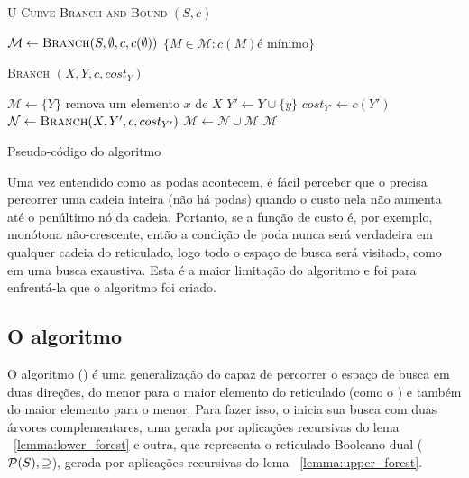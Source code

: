 \begin{algorithm}[!ht]
\textsc{U-Curve-Branch-and-Bound} $(S, c)$
\begin{algorithmic}[1]
    \State $\mathcal{M} \gets {\normalfont\textsc{Branch}} (S, \emptyset, c, c (\emptyset))$
    \Return $\{M \in \mathcal{M} : c(M) \text{é mínimo}\}$
\end{algorithmic}
\vspace{1em}

\textsc{Branch} $(X, Y, c, cost_Y)$
\begin{algorithmic}[1]
    \State $\mathcal{M} \gets \{Y\}$
        \State remova um elemento $x$ de $X$
        \State $Y' \gets Y \cup \{y\}$
        \State $cost_{Y'} \gets c (Y')$
            \State $\mathcal{N} \gets {\normalfont\textsc{Branch}} (X, Y', c, cost_{Y'})$
            \State $\mathcal{M} \gets \mathcal{N} \cup \mathcal{M}$
        \EndIf
    \EndWhile
    \Return $\mathcal{M}$
\end{algorithmic}
\caption{Pseudo-código do algoritmo }
\end{algorithm}

Uma vez entendido como as podas acontecem, é fácil perceber que o 
 precisa percorrer uma cadeia inteira (não há podas) quando
o custo nela não aumenta até o penúltimo nó da cadeia. Portanto, se a 
função de custo é, por exemplo, monótona não-crescente, então a condição
de poda nunca será verdadeira em qualquer cadeia do reticulado, logo 
todo o espaço de busca será visitado, como em uma busca exaustiva. Esta
é a maior limitação do algoritmo  e foi para enfrentá-la 
que o algoritmo  foi criado.

\subsection{O algoritmo }
O algoritmo  () é uma 
generalização do  capaz de percorrer o espaço de busca em
duas direções, do menor para o maior elemento do reticulado 
(como o ) e também do maior elemento para o menor. 
Para fazer isso, o  inicia sua busca com duas árvores 
complementares, uma gerada por 
aplicações recursivas do lema ~\ref{lemma:lower_forest} e outra, que 
representa o reticulado Booleano dual ($\mathcal{P} (S), \supseteq$), 
gerada por aplicações recursivas do lema ~\ref{lemma:upper_forest}.

